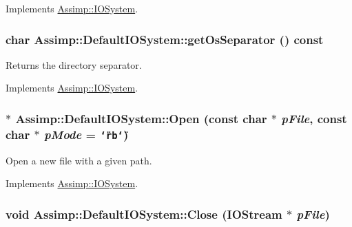 Implements \hyperlink{class_assimp_1_1_i_o_system_79f5fe8d2dbe1056c9418f7de9a72445}{Assimp::IOSystem}.\hypertarget{class_assimp_1_1_default_i_o_system_154a94adf38921d9fce50ef598f0a50c}{
\subsubsection[getOsSeparator]{\setlength{\rightskip}{0pt plus 5cm}char Assimp::DefaultIOSystem::getOsSeparator () const}}
\label{class_assimp_1_1_default_i_o_system_154a94adf38921d9fce50ef598f0a50c}


Returns the directory separator. 

Implements \hyperlink{class_assimp_1_1_i_o_system_40e412875b985bdb638f00ef0f20fff6}{Assimp::IOSystem}.\hypertarget{class_assimp_1_1_default_i_o_system_9c8da3d63312f47b2dec83ec90aa2c4d}{
\subsubsection[Open]{$\ast$ Assimp::DefaultIOSystem::Open (const char $\ast$ {\em pFile}, \/  const char $\ast$ {\em pMode} = {\tt \char`\"{}rb\char`\"{}})}}
\label{class_assimp_1_1_default_i_o_system_9c8da3d63312f47b2dec83ec90aa2c4d}


Open a new file with a given path. 

Implements \hyperlink{class_assimp_1_1_i_o_system_c512ece3b0701de5682553007a4c0816}{Assimp::IOSystem}.\hypertarget{class_assimp_1_1_default_i_o_system_a164cf18562082effde576752377bea3}{
\subsubsection[Close]{\setlength{\rightskip}{0pt plus 5cm}void Assimp::DefaultIOSystem::Close ({\bf IOStream} $\ast$ {\em pFile})}}
\label{class_assimp_1_1_default_i_o_system_a164cf18562082effde576752377bea3}


